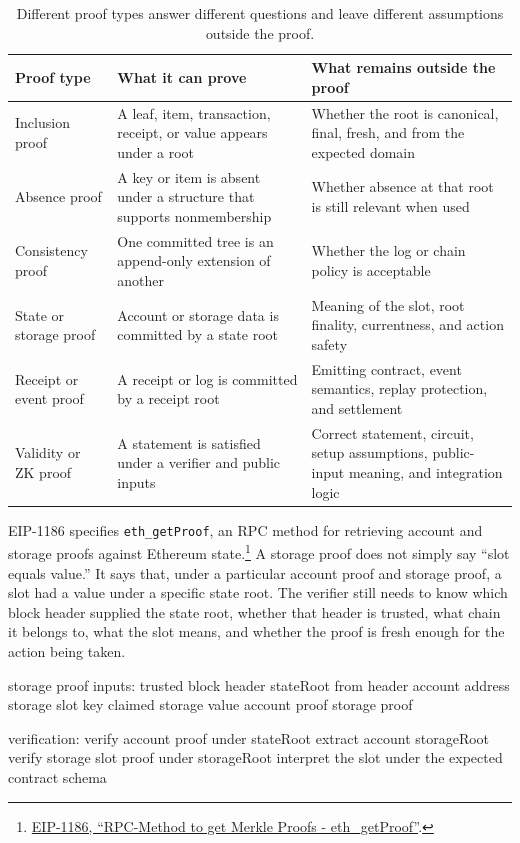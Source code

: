 \begin{table}[htbp]
\centering
\small
\renewcommand{\arraystretch}{1.18}
\begin{tabularx}{\textwidth}{@{}>{\RaggedRight\arraybackslash}p{}>{\RaggedRight\arraybackslash}p{}X@{}}
\toprule
Proof type & What it can prove & What remains outside the proof \\
\midrule
Inclusion proof & A leaf, item, transaction, receipt, or value appears under a root & Whether the root is canonical, final, fresh, and from the expected domain \\
Absence proof & A key or item is absent under a structure that supports nonmembership & Whether absence at that root is still relevant when used \\
Consistency proof & One committed tree is an append-only extension of another & Whether the log or chain policy is acceptable \\
State or storage proof & Account or storage data is committed by a state root & Meaning of the slot, root finality, currentness, and action safety \\
Receipt or event proof & A receipt or log is committed by a receipt root & Emitting contract, event semantics, replay protection, and settlement \\
Validity or ZK proof & A statement is satisfied under a verifier and public inputs & Correct statement, circuit, setup assumptions, public-input meaning, and integration logic \\
\bottomrule
\end{tabularx}
\caption{Different proof types answer different questions and leave different assumptions outside the proof.}
\end{table}

EIP-1186 specifies \texttt{eth\_getProof}, an RPC method for retrieving account and storage proofs against Ethereum state.\footnote{\href{https://eips.ethereum.org/EIPS/eip-1186}{EIP-1186, ``RPC-Method to get Merkle Proofs - eth\_getProof''}.} A storage proof does not simply say ``slot equals value.'' It says that, under a particular account proof and storage proof, a slot had a value under a specific state root. The verifier still needs to know which block header supplied the state root, whether that header is trusted, what chain it belongs to, what the slot means, and whether the proof is fresh enough for the action being taken.

\begin{codeblock}
storage proof inputs:
    trusted block header
    stateRoot from header
    account address
    storage slot key
    claimed storage value
    account proof
    storage proof

verification:
    verify account proof under stateRoot
    extract account storageRoot
    verify storage slot proof under storageRoot
    interpret the slot under the expected contract schema
\end{codeblock}

